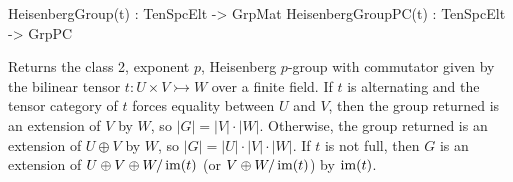\begin{intrinsics}
HeisenbergGroup(t) : TenSpcElt -> GrpMat
HeisenbergGroupPC(t) : TenSpcElt -> GrpPC
\end{intrinsics}

Returns the class 2, exponent $p$, Heisenberg $p$-group with commutator given by the bilinear tensor $t: U \times V \rightarrowtail W$ over a finite field. 
If $t$ is alternating and the tensor category of $t$ forces equality between $U$ and $V$, then the group returned is an extension of $V$ by $W$, so $|G| = |V|\cdot |W|$. 
Otherwise, the group returned is an extension of $U\oplus V$ by $W$, so $|G| = |U|\cdot |V| \cdot |W|$. 
If $t$ is not full, then $G$ is an extension of $U\oplus V\oplus W/\operatorname{im}(t)$ (or $V\oplus W/\operatorname{im}(t)$) by $\operatorname{im}(t)$. 

